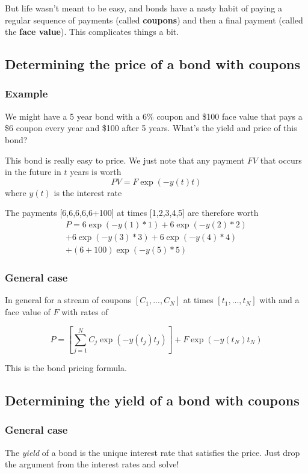 \documentclass{tran-l}
\theoremstyle{definition}
\theoremstyle{remark}
\numberwithin{equation}{subsection}
\begin{document}
But life wasn't meant to be easy, and bonds have a nasty habit of paying a regular sequence of payments (called \textbf{coupons}) and then a final payment (called the \textbf{face value}). This complicates things a bit.

\subsection{Determining the price of a bond with coupons}

\subsubsection{Example}
We might have a 5 year bond with a 6\% coupon and \$100 face value that pays a \$6 coupon every year and \$100 after 5 years. What's the yield and price of this bond?

This bond is really easy to price. We just note that any payment $FV$ that occurs in the future in $t$ years is worth \[PV = F\exp(-y(t)t)  \]
where $y(t)$ is the interest rate

The payments [6,6,6,6,6+100] at times [1,2,3,4,5] are therefore worth
\begin{eqnarray*}P = 6\exp(-y(1)*1)+6\exp(-y(2)*2)\\+6\exp(-y(3)*3)+6\exp(-y(4)*4)\\+(6+100)\exp(-y(5)*5)\end{eqnarray*}

\subsubsection{General case}
In general for a stream of coupons $[C_1,...,C_N]$ at times $[t_1,\ldots,t_N]$ with and a face value of $F$ with rates of

\begin{equation}P = \left[\sum_{j=1}^N C_j\exp(-y(t_j)t_j)\right] + F \exp(-y(t_N)t_N)  \label{bondPrice}\end{equation}

This is the bond pricing formula.

\subsection{Determining the yield of a bond with coupons}

\subsubsection{General case}
The \textit{yield} of a bond is the unique interest rate that satisfies the price. Just drop the argument from the interest rates and solve!
\end{document}
